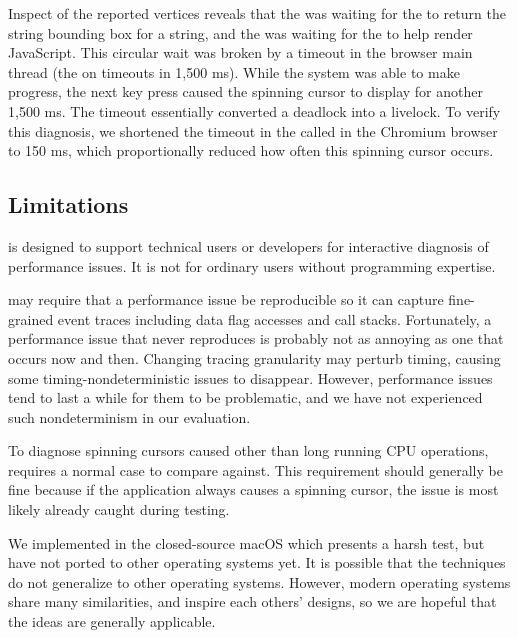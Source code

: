 Inspect of the reported vertices reveals that the  was waiting
for the  to return the string bounding box for a string, and the
 was waiting for the  to help render JavaScript.
This circular wait was broken by a timeout in the browser main thread (the
 on  timeouts in 1,500 ms). While the system
was able to make progress, the next key press caused the spinning cursor to
display for another 1,500 ms. The timeout essentially converted a deadlock
into a livelock. To verify this diagnosis, we shortened the timeout in the
 called in the Chromium browser to 150 ms, which
proportionally reduced how often this spinning cursor occurs.

\subsection{Limitations} \label{subsec:limit}

\xxx is designed to support technical users or developers for interactive
diagnosis of performance issues.  It is not for ordinary users without
programming expertise.

\xxx may require that a performance issue be reproducible so it can
capture fine-grained event traces including data flag accesses and call
stacks.  Fortunately, a performance issue that never reproduces is
probably not as annoying as one that occurs now and then.  Changing
tracing granularity may perturb timing, causing some
timing-nondeterministic issues to disappear.  However, performance issues
tend to last a while for them to be problematic, and we have not
experienced such nondeterminism in our evaluation.

To diagnose spinning cursors caused other than long running CPU
operations, \xxx requires a normal case to compare against.  This
requirement should generally be fine because if the application always
causes a spinning cursor, the issue is most likely already caught during
testing.

We implemented \xxx in the closed-source macOS which presents a harsh test,
but have not ported \xxx to other operating systems yet. It is possible
that the techniques do not generalize to other operating systems. However,
modern operating systems share many similarities, and inspire each others'
designs, so we are hopeful that the ideas are generally applicable.

